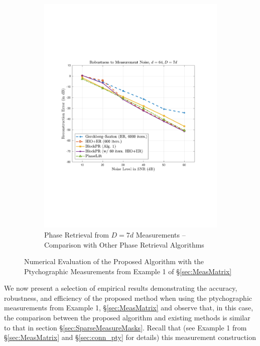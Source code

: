 \begin{figure}[hbtp]
\begin{subfigure}[b]{0.495\textwidth}
\includegraphics[clip=true, trim = 0.75in 2.75in 1in 2.5in,scale=0.45]{pics/robustness600_Fourier}
\caption{Phase Retrieval from $D=7d$ Measurements -- Comparison with Other Phase Retrieval Algorithms}
\label{fig:noise_robust_ptych}
\end{subfigure}
\caption{Numerical Evaluation of the Proposed Algorithm with the Ptychographic Measurements from
    Example 1 of \S \ref{sec:MeasMatrix}}
\label{fig:ptych_meas}
\end{figure}
%
{ We now present a selection of empirical results demonstrating the accuracy, robustness, and efficiency of the proposed method when using the ptychographic measurements from Example 1, \S\ref{sec:MeasMatrix} and observe that, in this case, the comparison between the proposed algorithm and existing methods is similar to that in section \S\ref{sec:SparseMeasureMasks}.}  Recall that (see Example 1 from \S \ref{sec:MeasMatrix} and \S \ref{sec:conn_pty} for details) this measurement construction
